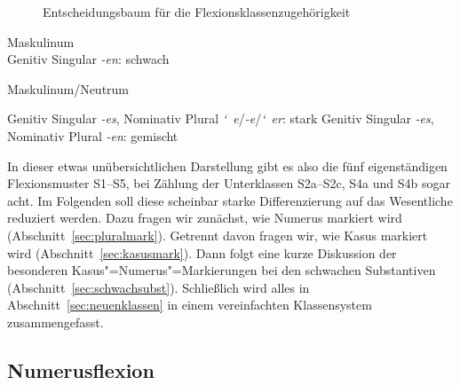 \begin{figure}[!htbp]
  \centering
  \caption{Entscheidungsbaum für die Flexionsklassenzugehörigkeit}
  \label{fig:substklassentsch}
\end{figure}

\begin{exe}
  \ex\label{ex:wuppdich1} Maskulinum\\
    Genitiv Singular \textit{-en}: schwach

  \Np

  \ex\label{ex:wuppdich2} Maskulinum\slash Neutrum
  \begin{xlist}
    \ex\label{ex:wuppdich2a} Genitiv Singular \textit{-es}, Nominativ Plural \textit{\char`~e}/\textit{-e}/\textit{\char`~er}: stark
    \ex\label{ex:wuppdich2b} Genitiv Singular \textit{-es}, Nominativ Plural \textit{-en}: gemischt
  \end{xlist}
\end{exe}

In dieser etwas unübersichtlichen Darstellung gibt es also die fünf eigenständigen Flexionsmuster S1--S5, bei Zählung der Unterklassen S2a--S2c, S4a und S4b sogar acht.
Im Folgenden soll diese scheinbar starke Differenzierung auf das Wesentliche reduziert werden.
Dazu fragen wir zunächst, wie Numerus markiert wird (Abschnitt~\ref{sec:pluralmark}).
Getrennt davon fragen wir, wie Kasus markiert wird (Abschnitt~\ref{sec:kasusmark}).
Dann folgt eine kurze Diskussion der besonderen Kasus"=Numerus"=Markierungen bei den schwachen Substantiven (Abschnitt~\ref{sec:schwachsubst}).
Schließlich wird alles in Abschnitt~\ref{sec:neuenklassen} in einem vereinfachten Klassensystem zusammengefasst.

\Stretch

\subsection{Numerusflexion}

